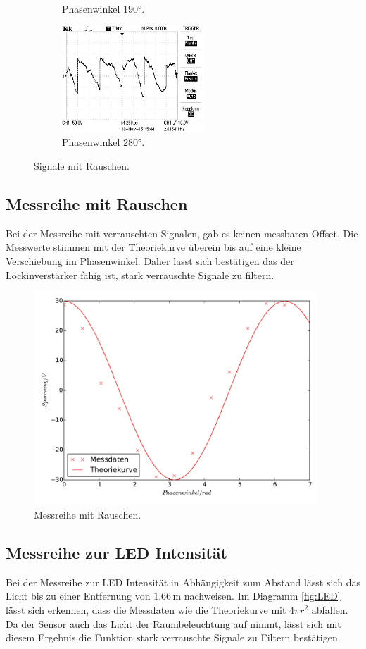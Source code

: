 \begin{figure}
\begin{subfigure}{0.48\textwidth}
    \caption{Phasenwinkel $190°$.}
    \label{fig:rp190}
  \end{subfigure}
  \begin{subfigure}{0.48\textwidth}
    \centering
    \includegraphics[height=4cm]{Bilder/r/r280.JPG}
    \caption{Phasenwinkel $280°$.}
    \label{fig:rp280}
  \end{subfigure}
\caption{Signale mit Rauschen.}
\label{fig:Signale mit Rauschen}
\end{figure}

\subsection{Messreihe mit Rauschen}
\label{sec:Messreihe mit Rauschen}
Bei der Messreihe mit verrauschten Signalen, gab es keinen messbaren Offset. Die
Messwerte stimmen mit der Theoriekurve überein bis auf eine kleine Verschiebung
im Phasenwinkel. Daher lasst sich bestätigen das der Lockinverstärker fähig ist,
stark verrauschte Signale zu filtern.
\begin{figure}
  \centering
  \includegraphics[height=8cm]{r_signal.pdf}
  \caption{Messreihe mit Rauschen.}
  \label{fig:Mr}
\end{figure}

\subsection{Messreihe zur LED Intensität}
\label{sec:Messreihe zur LED intensität}
Bei der Messreihe zur LED Intensität in Abhängigkeit zum Abstand lässt sich das
Licht bis zu einer Entfernung von $1.66\,\si{\meter}$ nachweisen. Im Diagramm
\ref{fig:LED} lässt sich erkennen, dass die Messdaten wie die Theoriekurve mit
$ 4\pi r^2$ abfallen. Da der Sensor auch das Licht der Raumbeleuchtung auf nimmt,
 lässt sich mit diesem Ergebnis die Funktion stark verrauschte Signale zu
Filtern bestätigen.

